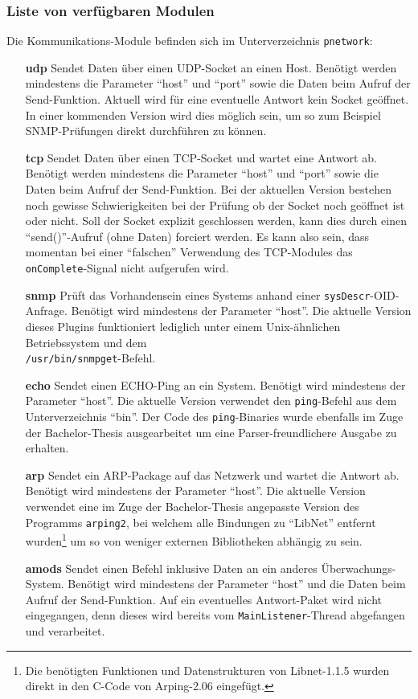 \subsubsection{Liste von verf\"ugbaren Modulen} \label{sec:praxis-basis-comm-list}
Die Kommunikations-Module befinden sich im Unterverzeichnis \texttt{pnetwork}:
\begin{itemize}
 \item[\textbf{udp}] Sendet Daten \"uber einen UDP-Socket an einen Host. Ben\"otigt werden mindestens die Parameter "`host"' und "`port"' sowie die Daten beim Aufruf der Send-Funktion. Aktuell wird f\"ur eine eventuelle Antwort kein Socket ge\"offnet. In einer kommenden Version wird dies m\"oglich sein, um so zum Beispiel SNMP-Pr\"ufungen direkt durchf\"uhren zu k\"onnen.

 \item[\textbf{tcp}] Sendet Daten \"uber einen TCP-Socket und wartet eine Antwort ab. Ben\"otigt werden mindestens die Parameter "`host"' und "`port"' sowie die Daten beim Aufruf der Send-Funktion. Bei der aktuellen Version bestehen noch gewisse Schwierigkeiten bei der Pr\"ufung ob der Socket noch ge\"offnet ist oder nicht. Soll der Socket explizit geschlossen werden, kann dies durch einen "`send()"'-Aufruf (ohne Daten) forciert werden. Es kann also sein, dass momentan bei einer "`falschen"' Verwendung des TCP-Modules das \texttt{onComplete}-Signal nicht aufgerufen wird.

 \item[\textbf{snmp}] Pr\"uft das Vorhandensein eines Systems anhand einer \texttt{sysDescr}-OID-Anfrage. Ben\"otigt wird mindestens der Parameter "`host"'. Die aktuelle Version dieses Plugins funktioniert lediglich unter einem Unix-\"ahnlichen Betriebssystem und dem\\ \texttt{/usr/bin/snmpget}-Befehl.

 \item[\textbf{echo}] Sendet einen ECHO-Ping an ein System. Ben\"otigt wird mindestens der Parameter "`host"'. Die aktuelle Version verwendet den \texttt{ping}-Befehl aus dem Unterverzeichnis "`bin"'. Der Code des \texttt{ping}-Binaries wurde ebenfalls im Zuge der Bachelor-Thesis ausgearbeitet um eine Parser-freundlichere Ausgabe zu erhalten.

 \item[\textbf{arp}] Sendet ein ARP-Package auf das Netzwerk und wartet die Antwort ab. Ben\"otigt wird mindestens der Parameter "`host"'. Die aktuelle Version verwendet eine im Zuge der Bachelor-Thesis angepasste Version des Programms \texttt{arping2}, bei welchem alle Bindungen zu "`LibNet"' entfernt wurden\footnote{Die ben\"otigten Funktionen und Datenstrukturen von Libnet-1.1.5 wurden direkt in den C-Code von Arping-2.06 eingef\"ugt.} um so von weniger externen Bibliotheken abh\"angig zu sein.

 \item[\textbf{amods}] Sendet einen Befehl inklusive Daten an ein anderes \"Uberwachungs-System. Ben\"otigt wird mindestens der Parameter "`host"' und die Daten beim Aufruf der Send-Funktion. Auf ein eventuelles Antwort-Paket wird nicht eingegangen, denn dieses wird bereits vom \texttt{MainListener}-Thread abgefangen und verarbeitet.
\end{itemize}



